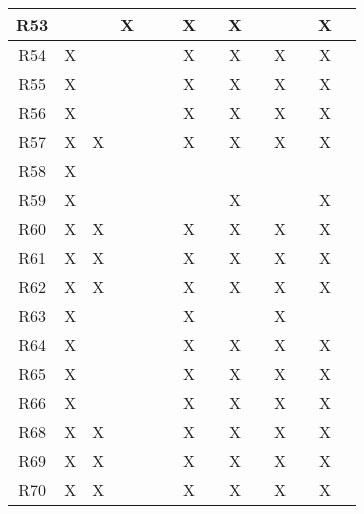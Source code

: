 \begin{table}[H]
\begin{tabular}{|c|c|c|c|c|c|c|c|c|c|c|c|c|c|}
\hline
{\cellcolor[rgb]{0.71,0.102,0}}R53 &    &    & X  &    &    & X  &    & X  &    &     &      & X   &      \\ 
\hline
{\cellcolor[rgb]{0.71,0.102,0}}R54 & X  &    &    &    &    & X  &    & X  &    & X   &      & X   &      \\ 
\hline
{\cellcolor[rgb]{0.71,0.102,0}}R55 & X  &    &    &    &    & X  &    & X  &    & X   &      & X   &      \\ 
\hline
{\cellcolor[rgb]{0.71,0.102,0}}R56 & X  &    &    &    &    & X  &    & X  &    & X   &      & X   &      \\ 
\hline
{\cellcolor[rgb]{0.71,0.102,0}}R57 & X  & X  &    &    &    & X  &    & X  &    & X   &      & X   &      \\ 
\hline
{\cellcolor[rgb]{0.71,0.102,0}}R58 & X  &    &    &    &    &    &    &    &    &     &      &     &      \\ 
\hline
{\cellcolor[rgb]{0.71,0.102,0}}R59 & X  &    &    &    &    &    &    & X  &    &     &      & X   &      \\ 
\hline
{\cellcolor[rgb]{0.71,0.102,0}}R60 & X  & X  &    &    &    & X  &    & X  &    & X   &      & X   &      \\ 
\hline
{\cellcolor[rgb]{0.71,0.102,0}}R61 & X  & X  &    &    &    & X  &    & X  &    & X   &      & X   &      \\ 
\hline
{\cellcolor[rgb]{0.71,0.102,0}}R62 & X  & X  &    &    &    & X  &    & X  &    & X   &      & X   &      \\ 
\hline
{\cellcolor[rgb]{0.71,0.102,0}}R63 & X  &    &    &    &    & X  &    &    &    & X   &      &     &      \\ 
\hline
{\cellcolor[rgb]{0.71,0.102,0}}R64 & X  &    &    &    &    & X  &    & X  &    & X   &      & X   &      \\ 
\hline
{\cellcolor[rgb]{0.71,0.102,0}}R65 & X  &    &    &    &    & X  &    & X  &    & X   &      & X   &      \\ 
\hline
{\cellcolor[rgb]{0.71,0.102,0}}R66 & X  &    &    &    &    & X  &    & X  &    & X   &      & X   &      \\ 
\hline
{\cellcolor[rgb]{0.71,0.102,0}}R68 & X  & X  &    &    &    & X  &    & X  &    & X   &      & X   &      \\ 
\hline
{\cellcolor[rgb]{0.71,0.102,0}}R69 & X  & X  &    &    &    & X  &    & X  &    & X   &      & X   &      \\ 
\hline
{\cellcolor[rgb]{0.71,0.102,0}}R70 & X  & X  &    &    &    & X  &    & X  &    & X   &      & X   &      \\ 

\end{tabular}
\end{table}

